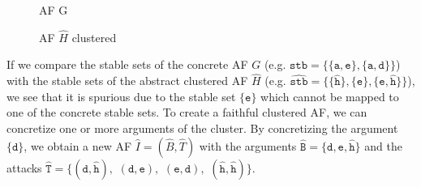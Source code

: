 \vspace{0.3cm}
\begin{figure}[h]
\begin{minipage}{.5\textwidth}
    \centering
    \caption{\ac{AF} G}
    \label{af:backgroundClusterExample1}
\end{minipage}%
\begin{minipage}{.5\textwidth}
    \centering
    \caption{\ac{AF} $\hat{H}$ clustered}
    \label{af:backgroundClusterExample2}
\end{minipage}
\end{figure}

If we compare the stable sets of the concrete AF $G$ (e.g. $\mathtt{stb=\{\{a, e\}, \{a, d\}\}}$) with the stable sets of the abstract clustered AF $\hat{H}$ (e.g. $\mathtt{\hat{stb}=\{\{\hat{h}\}, \{e\}, \{e, \hat{h}\}\}}$), we see that it is spurious due to the stable set $\mathtt{\{e\}}$ which cannot be mapped to one of the concrete stable sets. To create a faithful clustered AF, we can concretize one or more arguments of the cluster. By concretizing the argument $\mathtt{\{d\}}$, we obtain a new AF $\hat{I}=(\hat{B}, \hat{T})$ with the arguments $\mathtt{\hat{B}=\{d, e, \hat{h}\}}$ and the attacks $\mathtt{\hat{T}=\{(d, \hat{h}),}$
$\mathtt{(d, e),}$
$\mathtt{(e, d),}$
$\mathtt{(\hat{h}, \hat{h})\}}$.

